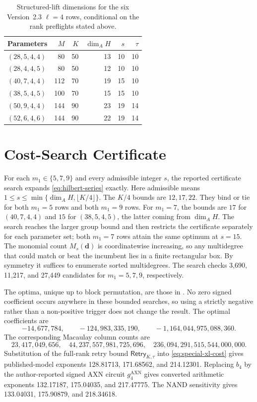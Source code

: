 \documentclass[11pt]{article}
\begin{document}
\begin{table}[tbp]
\centering
\caption{Structured-lift dimensions for the six Version~2.3 $\ell=4$ rows,
conditional on the rank preflights stated above.}
\label{tab:dimensions}
\small
\setlength{\tabcolsep}{5pt}
\begin{tabular}{@{}l r r r r r@{}}
\toprule
Parameters & $M$ & $K$ & $\dim_A H$ & $s$ & $\tau$\\
\midrule
$(28,5,4,4)$ & 80  & 50 & 13 & 10 & 10\\
$(28,4,4,5)$ & 80  & 50 & 12 & 10 & 10\\
$(40,7,4,4)$ & 112 & 70 & 19 & 15 & 10\\
$(38,5,4,5)$ & 100 & 70 & 15 & 15 & 10\\
$(50,9,4,4)$ & 144 & 90 & 23 & 19 & 14\\
$(52,6,4,6)$ & 144 & 90 & 22 & 19 & 14\\
\bottomrule
\end{tabular}
\end{table}

\section{Cost-Search Certificate}\label{app:cost-certificates}

For each $m_1\in\{5,7,9\}$ and every admissible integer $s$, the reported
certificate search
expands \eqref{eq:hilbert-series} exactly.  Here admissible means
$1\le s\le\min\{\dim_A H,\lfloor K/4\rfloor\}$.  The $K/4$ bounds are
$12,17,22$.  They bind or tie for both $m_1=5$ rows and both $m_1=9$ rows.
For $m_1=7$, the bounds are $17$ for $(40,7,4,4)$ and $15$ for
$(38,5,4,5)$, the latter coming from $\dim_A H$.  The search reaches
the larger group bound and then restricts the certificate separately for each
parameter set; both $m_1=7$ rows attain the same optimum at $s=15$.
The monomial count
$M_s(\mathbf d)$ is coordinatewise increasing, so any multidegree that could
match or beat the incumbent lies in a finite rectangular box.  By symmetry it
suffices to enumerate sorted multidegrees.  The search checks 3,690, 11,217,
and 27,449 candidates for $m_1=5,7,9$, respectively.
 
The optima, unique up
to block permutation, are
those in .  No zero signed coefficient occurs anywhere
in these bounded searches, so using a strictly negative rather than a
non-positive trigger does not change the result.  The optimal coefficients are
\[
 -14{,}677{,}784,\qquad
 -124{,}983{,}335{,}190,\qquad
 -1{,}164{,}044{,}975{,}088{,}360.
\]
The corresponding Macaulay column counts are
\[
 23{,}417{,}049{,}656,
 \quad 44{,}237{,}557{,}981{,}725{,}696,
 \quad 236{,}094{,}291{,}515{,}544{,}000{,}000.
\]
Substitution of the full-rank retry bound
$\mathsf{Retry}_{K,\tau}$ into \eqref{eq:special-xl-cost} gives published-model exponents
128.81713, 171.68562, and 214.12301.  Replacing $b_4$ by the
author-reported signed AXN circuit
$g_4^{\mathrm{AXN}}$ gives converted arithmetic exponents 132.17187,
175.04035, and 217.47775.  The NAND sensitivity gives 133.04031, 175.90879,
and 218.34618.
\end{document}
